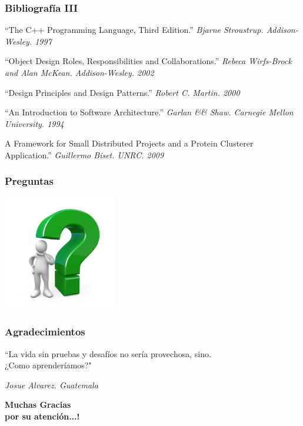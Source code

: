     \begin{frame}\frametitle{\textbf{Bibliografía III}}
		\begin{thebibliography}{4}
		  \beamertemplatebookbibitems
		    “The C++ Programming Language, Third Edition.”
        \newblock \emph{Bjarne Stroustrup. Addison-Wesley. 1997} 

        “Object Design Roles, Responsibilities and Collaborations.”
        \newblock \emph{Rebeca Wirfs-Brock and Alan McKean. Addison-Wesley. 2002} 

        “Design Principles and Design Patterns.”
        \newblock \emph{Robert C. Martin. 2000} 
        
        “An Introduction to Software Architecture.”
        \newblock \emph{Garlan  && Shaw. Carnegie Mellon University. 1994} 

        A Framework for Small Distributed Projects and a Protein Clusterer Application.”
        \newblock \emph{Guillermo Biset. UNRC. 2009}         
		\end{thebibliography}
    \end{frame}

	\begin{frame}\frametitle{\textbf{Preguntas}}
			\begin{center}
				\includegraphics[height=5cm]{images/preguntas.png}
			\end{center}
	\end{frame}	

\begin{frame}\frametitle{\textbf{Agradecimientos}}
\begin{center}
  \normalsize
  ``La vida sin pruebas y desafíos no sería provechosa, sino.  \\
  ¿Como aprenderíamos?"

  \begin{flushright}
  \textit{Josue Alvarez. Guatemala}\\
  \end{flushright}
   
  \pause   
  \vspace{1cm}
  \textbf{Muchas Gracias \\ por su atención...!} 
\end{center}
\end{frame}